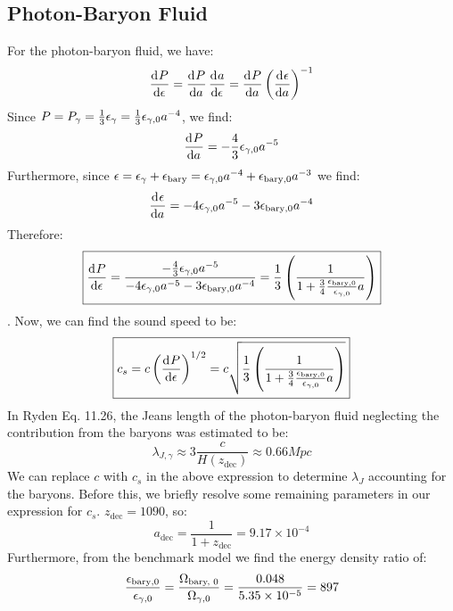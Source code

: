\subsection{Photon-Baryon Fluid}
For the photon-baryon fluid, we have:
\begin{equation}
    \dod{P}{\e} = \dod{P}{a}\dod{a}{\e} = \dod{P}{a}\left(\dod{\e}{a}\right)^{-1}
\end{equation}
Since $P = P_\gamma = \frac{1}{3}\epsilon_{\gamma} = \frac{1}{3}\epsilon_{\gamma, 0} a^{-4}$, we find:
\begin{equation}
    \dod{P}{a} = -\frac{4}{3}\e_{\gamma, 0} a^{-5}
\end{equation}
Furthermore, since $\epsilon = \epsilon_\gamma + \epsilon_{\text{bary}} = \epsilon_{\gamma, 0}a^{-4} + \epsilon_{\text{bary}, 0}a^{-3}$ we find:
\begin{equation}
    \dod{\e}{a} = -4\e_{\gamma, 0}a^{-5} - 3\e_{\text{bary}, 0}a^{-4}
\end{equation}
Therefore:
\begin{equation}
    \boxed{\dod{P}{\e} = \frac{-\frac{4}{3}\e_{\gamma, 0} a^{-5}}{-4\e_{\gamma, 0}a^{-5} - 3\e_{\text{bary}, 0}a^{-4}} = \frac{1}{3}\left(\frac{1}{1 + \frac{3}{4}\frac{\e_{\text{bary}, 0}}{\e_{\gamma,0}} a}\right)}
\end{equation}. Now, we can find the sound speed to be:
\begin{equation}\label{cs}
    \boxed{c_s = c\left(\dod{P}{\e}\right)^{1/2} = c\sqrt{\frac{1}{3}\left(\frac{1}{1 + \frac{3}{4}\frac{\e_{\text{bary}, 0}}{\e_{\gamma,0}} a}\right)}}
\end{equation}
In Ryden Eq. 11.26, the Jeans length of the photon-baryon fluid neglecting the contribution from the baryons was estimated to be:
\begin{equation}
    \lambda_{J, \gamma} \approx 3\frac{c}{H(z_{\text{dec}})} \approx 0.66\si{Mpc}
\end{equation}
We can replace $c$ with $c_s$ in the above expression to determine $\lambda_J$ accounting for the baryons. Before this, we briefly resolve some remaining parameters in our expression for $c_s$. $z_{\text{dec}} = 1090$, so:
\begin{equation}
    a_{\text{dec}} = \frac{1}{1 + z_{\text{dec}}} = 9.17 \times 10^{-4}
\end{equation}
Furthermore, from the benchmark model we find the energy density ratio of:
\begin{equation}
    \frac{\epsilon_{\text{bary}, 0}}{\epsilon_{\gamma,0}} = \frac{\Omega_{\text{bary, 0}}}{\Omega_{\gamma, 0}} = \frac{0.048}{5.35\times 10^{-5}} = 897
\end{equation}
